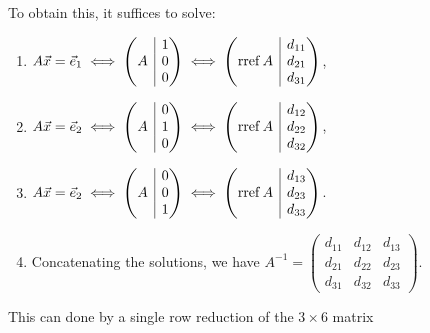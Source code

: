 \documentclass[main.tex]{subfiles}
\begin{document}
To obtain this, it suffices to solve:
\begin{enumerate}
    \item $A\vx = \vec{e}_1 \iff \parens{\begin{array}{@{}c | c@{}}
        & 1 \\
        A & 0 \\
        & 0
    \end{array}}\iff \parens{\begin{array}{@{}c | c@{}}
        & d_{11} \\
        \rref A & d_{21} \\
        & d_{31}
    \end{array}}$,
    \item $A\vx = \vec{e}_2 \iff \parens{\begin{array}{@{}c | c@{}}
        & 0 \\
        A & 1 \\
        & 0
    \end{array}}\iff \parens{\begin{array}{@{}c | c@{}}
        & d_{12} \\
        \rref A & d_{22} \\
        & d_{32}
    \end{array}}$,
    \item $A\vx = \vec{e}_2 \iff \parens{\begin{array}{@{}c | c@{}}
        & 0 \\
        A & 0 \\
        & 1
    \end{array}}\iff \parens{\begin{array}{@{}c | c@{}}
        & d_{13} \\
        \rref A & d_{23} \\
        & d_{33}
    \end{array}}$.
    \item Concatenating the solutions, we have
    $A^{-1} = \begin{pmatrix}
        d_{11} & d_{12} & d_{13} \\
        d_{21} & d_{22} & d_{23} \\
        d_{31} & d_{32} & d_{33}
    \end{pmatrix}.$
\end{enumerate}
This can done by a single row reduction of the $3\times 6$ matrix
\end{document}

